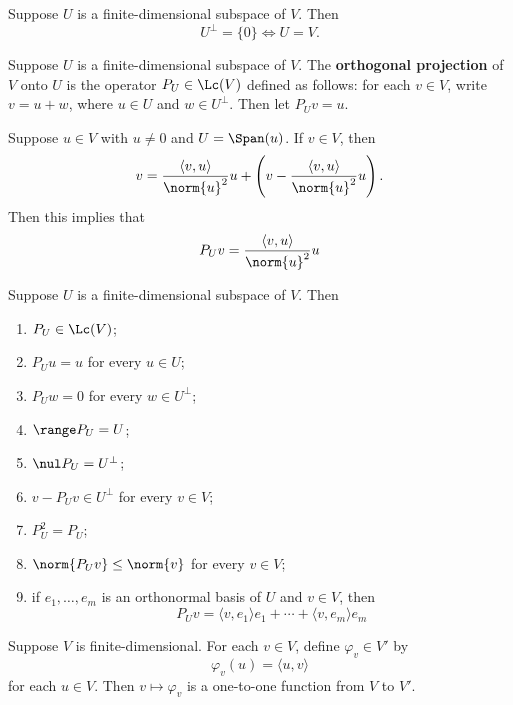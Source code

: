 \documentclass{extarticle}
\begin{document}
\begin{corollary}
    Suppose \(U\) is a finite-dimensional subspace of \(V\). Then
    \[U^\perp = \{0\} \Longleftrightarrow U = V.\]
\end{corollary}

\begin{definition}
    Suppose \(U\) is a finite-dimensional subspace of \(V\). The \textbf{orthogonal projection} of \(V\)
    onto \(U\) is the operator \(P_U \in \Lc(V)\) defined as follows: for each \(v \in V\), write \(v = u + w\),
    where \(u \in U\) and \(w \in U^\perp\). Then let \(P_U v = u\).
\end{definition}

\begin{remark}
    Suppose \(u \in V\) with \(u \neq 0\) and \(U = \Span(u)\). If \(v \in V\), then
    \[v = \frac{\langle v,u \rangle}{\norm{u}^2}u + \left(v - \frac{\langle v,u \rangle}{\norm{u}^2}u \right).\]
    Then this implies that
    \[P_U v = \frac{\langle v,u \rangle}{\norm{u}^2}u\]
\end{remark}

\begin{corollary}
    Suppose \(U\) is a finite-dimensional subspace of \(V\). Then
    \begin{enumerate}[label=(\alph*)]
        \item \(P_U \in \Lc(V)\);
        \item \(P_U u = u\) for every \(u \in U\);
        \item \(P_U w = 0\) for every \(w \in U^\perp\);
        \item \(\range P_U = U\);
        \item \(\nul P_U = U^\perp\);
        \item \(v - P_Uv \in U^\perp\) for every \(v \in V\);
        \item \(P_U^2 = P_U\);
        \item \(\norm{P_U v} \leq \norm{v}\) for every \(v \in V\);
        \item if \(e_1, \ldots, e_m\) is an orthonormal basis of \(U\) and \(v \in V\), then
        \[P_U v = \langle v,e_1 \rangle e_1 + \cdots + \langle v,e_m \rangle e_m\]
    \end{enumerate}
\end{corollary}

\begin{thm}
    Suppose \(V\) is finite-dimensional. For each \(v \in V\), define \(\varphi_v \in V'\) by
    \[\varphi_v (u) = \langle u,v \rangle\]
    for each \(u \in V\). Then \(v \mapsto \varphi_v\) is a one-to-one function from \(V\) to
    \(V'\).
\end{thm}
\end{document}
